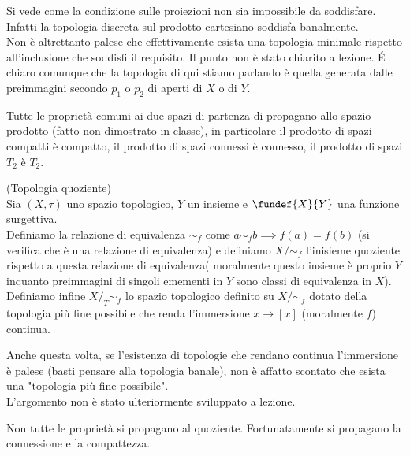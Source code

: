 \begin{oss}
Si vede come la condizione sulle proiezioni non sia impossibile da soddisfare. Infatti la topologia discreta sul prodotto cartesiano soddisfa banalmente.\\
Non è altrettanto palese che effettivamente esista una topologia minimale rispetto all'inclusione che soddisfi il requisito. Il punto non è stato chiarito a lezione. \'E chiaro comunque che la topologia di qui stiamo parlando è quella generata dalle preimmagini secondo $p_1$ o $p_2$ di aperti di $X$ o di $Y$.\\
\end{oss}

\begin{oss}
Tutte le proprietà comuni ai due spazi di partenza di propagano allo spazio prodotto (fatto non dimostrato in classe), in particolare il prodotto di spazi compatti è compatto, il prodotto di spazi connessi è connesso, il prodotto di spazi $T_2$ è $T_2$.
\end{oss}

\begin{defn}
(Topologia quoziente)\\
Sia $(X,\tau)$ uno spazio topologico, $Y$ un insieme e $\fundef{X}{Y}$ una funzione surgettiva. \\
Definiamo la relazione di equivalenza $\sim_f$ come $a\sim_f b \implies f(a)=f(b)$ (si verifica che è una relazione di equivalenza) e definiamo $X/\sim_f$ l'inisieme quoziente rispetto a questa relazione di equivalenza( moralmente questo insieme è proprio $Y$ inquanto preimmagini di singoli emementi in $Y$ sono classi di equivalenza in $X$).\\
Definiamo infine $X/_T \sim_f$ lo spazio topologico definito su $X/\sim_f$ dotato della topologia più fine possibile che renda l'immersione $x \rightarrow [x]$ (moralmente $f$) continua.
\end{defn}

\begin{oss}
Anche questa volta, se l'esistenza di topologie che rendano continua l'immersione è palese (basti pensare alla topologia banale), non è affatto scontato che esista una "topologia più fine possibile".\\
L'argomento non è stato ulteriormente sviluppato a lezione.
\end{oss}

\begin{oss}
Non tutte le proprietà si propagano al quoziente. Fortunatamente si propagano la connessione e la compattezza.
\end{oss}

